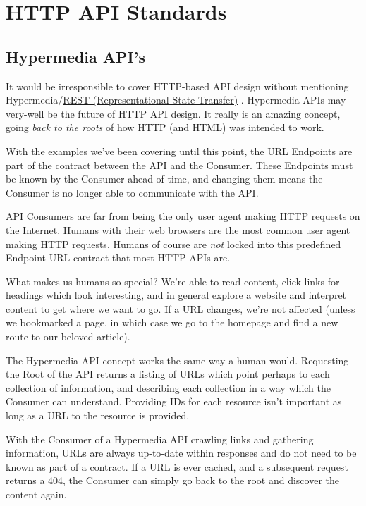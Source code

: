 \chapter{HTTP API Standards}

\section{Hypermedia API's}

It would be irresponsible to cover HTTP-based API design without mentioning Hypermedia/\href{http://www.ics.uci.edu/~fielding/pubs/dissertation/rest_arch_style.htm}{REST (Representational State Transfer)} \cite{REST}. Hypermedia APIs may very-well be the future of HTTP API design. It really is an amazing concept, going \emph{back to the roots} of how HTTP (and HTML) was intended to work.

With the examples we've been covering until this point, the URL Endpoints are part of the contract between the API and the Consumer. These Endpoints must be known by the Consumer ahead of time, and changing them means the Consumer is no longer able to communicate with the API.

API Consumers are far from being the only user agent making HTTP requests on the Internet. Humans with their web browsers are the most common user agent making HTTP requests. Humans of course are \emph{not} locked into this predefined Endpoint URL contract that most HTTP APIs are.

What makes us humans so special? We're able to read content, click links for headings which look interesting, and in general explore a website and interpret content to get where we want to go. If a URL changes, we're not affected (unless we bookmarked a page, in which case we go to the homepage and find a new route to our beloved article).

The Hypermedia API concept works the same way a human would. Requesting the Root of the API returns a listing of URLs which point perhaps to each collection of information, and describing each collection in a way which the Consumer can understand. Providing IDs for each resource isn't important as long as a URL to the resource is provided.

With the Consumer of a Hypermedia API crawling links and gathering information, URLs are always up-to-date within responses and do not need to be known as part of a contract. If a URL is ever cached, and a subsequent request returns a 404, the Consumer can simply go back to the root and discover the content again.

